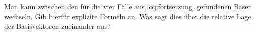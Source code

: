 \begin{sheet}
	\begin{problem}[title={Basiswechsel zwischen verschiedenen Gelfand-Zetlin-Basen}]
			Man kann zwischen den für die vier Fälle aus \ref{cq:fortsetzung} gefundenen Basen wechseln. Gib hierfür explizite Formeln an. Was sagt dies über die relative Lage der Basisvektoren zueinander aus?
	\end{problem}




\end{sheet}